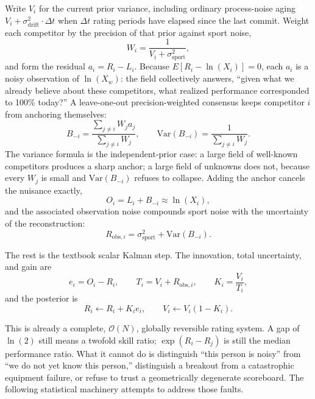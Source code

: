 \documentclass[12pt]{article}
\newcommand{\ssport}{\sigma_{\mathrm{sport}}^2}      %
\newcommand{\sdrift}{\sigma_{\mathrm{drift}}^2}
\newcommand{\xwin}{X_w}
\newcommand{\bloo}{B_{-i}}
\begin{document}
	Write $V_i$ for the current prior variance, including ordinary process-noise aging $V_i + \sdrift \cdot \Delta t$ when $\Delta t$ rating periods have elapsed since the last commit. Weight each competitor by the precision of that prior against sport noise,
	\begin{equation}
		W_i = \frac{1}{V_i + \ssport},
	\end{equation}
	and form the residual $a_i = R_i - L_i$. Because $E[R_i - \ln(X_i)] = 0$, each $a_i$ is a noisy observation of $\ln(\xwin)$: the field collectively answers, ``given what we already believe about these competitors, what realized performance corresponded to 100\% today?'' A leave-one-out precision-weighted consensus keeps competitor $i$ from anchoring themselves:
	\begin{equation}
		\bloo = \frac{\sum_{j \neq i} W_j a_j}{\sum_{j \neq i} W_j}, \qquad
		\mathrm{Var}(\bloo) = \frac{1}{\sum_{j \neq i} W_j}.
	\end{equation}
	The variance formula is the independent-prior case: a large field of well-known competitors produces a sharp anchor; a large field of unknowns does not, because every $W_j$ is small and $\mathrm{Var}(\bloo)$ refuses to collapse. Adding the anchor cancels the nuisance exactly,
	\begin{equation}
		O_i = L_i + \bloo \approx \ln(X_i),
	\end{equation}
	and the associated observation noise compounds sport noise with the uncertainty of the reconstruction:
	\begin{equation}
		R_{\mathrm{obs},i} = \ssport + \mathrm{Var}(\bloo).
	\end{equation}

	The rest is the textbook scalar Kalman step. The innovation, total uncertainty, and gain are
	\begin{equation}
		e_i = O_i - R_i, \qquad
		T_i = V_i + R_{\mathrm{obs},i}, \qquad
		K_i = \frac{V_i}{T_i},
	\end{equation}
	and the posterior is
	\begin{equation}
		R_i \leftarrow R_i + K_i e_i, \qquad
		V_i \leftarrow V_i (1 - K_i).
	\end{equation}

	This is already a complete, $\mathcal{O}(N)$, globally reversible rating system. A gap of $\ln(2)$ still means a twofold skill ratio; $\exp(R_i - R_j)$ is still the median performance ratio. What it cannot do is distinguish ``this person is noisy'' from ``we do not yet know this person,'' distinguish a breakout from a catastrophic equipment failure, or refuse to trust a geometrically degenerate scoreboard. The following statistical machinery attempts to address those faults.
\end{document}
